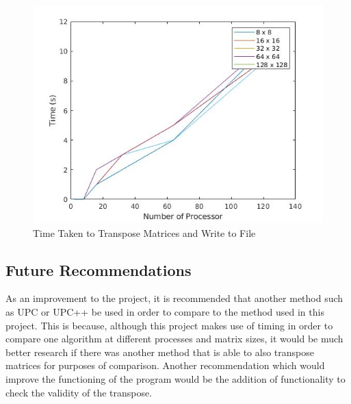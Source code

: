 \documentclass[11pt,conference]{IEEEtran}
\begin{document}
\begin{figure}[h!]
    \centering
    \includegraphics[scale=0.5]{out.jpg}
    \caption{Time Taken to Transpose Matrices and Write to File}
    \label{7}
\end{figure}




\subsection{Future Recommendations}
\noindent
As an improvement to the project, it is recommended that another method such as UPC or UPC++ be used in order to compare to the method used in this project. This is because, although this project makes use of timing in order to compare one algorithm at different processes and matrix sizes, it would be much better research if there was another method that is able to also transpose matrices for purposes of comparison. Another recommendation which would improve the functioning of the program would be the addition of functionality to check the validity of the transpose.
\end{document}
